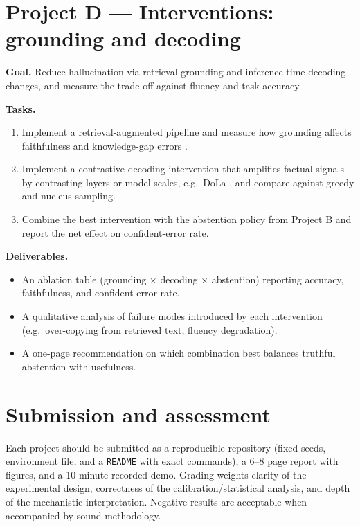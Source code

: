 \documentclass[11pt]{article}
\begin{document}
\section{Project D --- Interventions: grounding and decoding}

\textbf{Goal.} Reduce hallucination via retrieval grounding and inference-time
decoding changes, and measure the trade-off against fluency and task accuracy.

\textbf{Tasks.}
\begin{enumerate}[leftmargin=*]
  \item Implement a retrieval-augmented pipeline and measure how grounding
    affects faithfulness and knowledge-gap errors \citep{lewis2020rag}.
  \item Implement a contrastive decoding intervention that amplifies factual
    signals by contrasting layers or model scales, e.g.\ DoLa
    \citep{chuang2024dola}, and compare against greedy and nucleus sampling.
  \item Combine the best intervention with the abstention policy from Project B
    and report the net effect on confident-error rate.
\end{enumerate}

\textbf{Deliverables.}
\begin{itemize}[leftmargin=*]
  \item An ablation table (grounding $\times$ decoding $\times$ abstention)
    reporting accuracy, faithfulness, and confident-error rate.
  \item A qualitative analysis of failure modes introduced by each intervention
    (e.g.\ over-copying from retrieved text, fluency degradation).
  \item A one-page recommendation on which combination best balances truthful
    abstention with usefulness.
\end{itemize}

\section*{Submission and assessment}

Each project should be submitted as a reproducible repository (fixed seeds,
environment file, and a \texttt{README} with exact commands), a 6--8 page report
with figures, and a 10-minute recorded demo. Grading weights clarity of the
experimental design, correctness of the calibration/statistical analysis, and
depth of the mechanistic interpretation. Negative results are acceptable when
accompanied by sound methodology.
\end{document}

